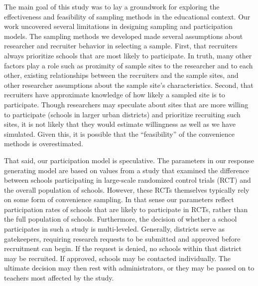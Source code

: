 \documentclass[man,floatsintext]{apa6}
\theoremstyle{definition}
\theoremstyle{definition}
\theoremstyle{definition}
\theoremstyle{remark}
\begin{document}
The main goal of this study was to lay a groundwork for exploring the
effectiveness and feasibility of sampling methods in the educational
context. Our work uncovered several limitations in designing sampling
and participation models. The sampling methods we developed made several
assumptions about researcher and recruiter behavior in selecting a
sample. First, that recruiters always prioritize schools that are most
likely to participate. In truth, many other factors play a role such as
proximity of sample sites to the researcher and to each other, existing
relationships between the recruiters and the sample sites, and other
researcher assumptions about the sample site's characteristics. Second,
that recruiters have approximate knowledge of how likely a sampled site
is to participate. Though researchers may speculate about sites that are
more willing to participate (schools in larger urban districts) and
prioritize recruiting such sites, it is not likely that they would
estimate willingness as well as we have simulated. Given this, it is
possible that the \enquote{feasibility} of the convenience methods is
overestimated.

That said, our participation model is speculative. The parameters in our
response generating model are based on values from a study that examined
the difference between schools participating in large-scale randomized
control trials (RCT) and the overall population of schools. However,
these RCTs themselves typically rely on some form of convenience
sampling. In that sense our parameters reflect participation rates of
schools that are likely to participate in RCTs, rather than the full
population of schools. Furthermore, the decision of whether a school
participates in such a study is multi-leveled. Generally, districts
serve as gatekeepers, requiring research requests to be submitted and
approved before recruitment can begin. If the request is denied, no
schools within that district may be recruited. If approved, schools may
be contacted individually. The ultimate decision may then rest with
administrators, or they may be passed on to teachers most affected by
the study.
\end{document}
